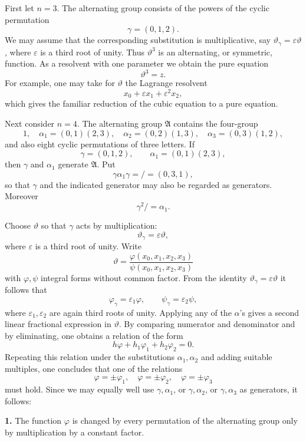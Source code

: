 \documentclass[11pt,a4paper]{book}
\newcommand{\A}{\mathfrak A}
\begin{document}
First let $n=3$.  The alternating group consists of the powers of the cyclic permutation
\[
 \gamma=(0,1,2).
\]
We may assume that the corresponding substitution is multiplicative, say $\vartheta_\gamma=\varepsilon\vartheta$, where $\varepsilon$ is a third root of unity.  Thus $\vartheta^3$ is an alternating, or symmetric, function.  As a resolvent with one parameter we obtain the pure equation
\[
 \vartheta^3=z.
\]
For example, one may take for $\vartheta$ the Lagrange resolvent
\[
 x_0+\varepsilon x_1+\varepsilon^2x_2,
\]
which gives the familiar reduction of the cubic equation to a pure equation.

Next consider $n=4$.  The alternating group $\A$ contains the four-group
\[
 1,
 \quad\alpha_1=(0,1)(2,3),
 \quad\alpha_2=(0,2)(1,3),
 \quad\alpha_3=(0,3)(1,2),
\]
and also eight cyclic permutations of three letters.  If
\[
 \gamma=(0,1,2),\qquad \alpha_1=(0,1)(2,3),
\]
then $\gamma$ and $\alpha_1$ generate $\A$.  Put
\[
 \gamma\alpha_1\gamma=/\!=(0,3,1),
\]
so that $\gamma$ and the indicated generator may also be regarded as generators.  Moreover
\begin{equation}
 \gamma^2/=\alpha_1.
\end{equation}

Choose $\vartheta$ so that $\gamma$ acts by multiplication:
\[
 \vartheta_\gamma=\varepsilon\vartheta,
\]
where $\varepsilon$ is a third root of unity.  Write
\begin{equation}
 \vartheta=\frac{\varphi(x_0,x_1,x_2,x_3)}{\psi(x_0,x_1,x_2,x_3)}
\end{equation}
with $\varphi,\psi$ integral forms without common factor.  From the identity $\vartheta_\gamma=\varepsilon\vartheta$ it follows that
\[
 \varphi_\gamma=\varepsilon_1\varphi,
 \qquad
 \psi_\gamma=\varepsilon_2\psi,
\]
where $\varepsilon_1,\varepsilon_2$ are again third roots of unity.  Applying any of the $\alpha$'s gives a second linear fractional expression in $\vartheta$.  By comparing numerator and denominator and by eliminating, one obtains a relation of the form
\[
 h\varphi+h_1\varphi_1+h_2\varphi_2=0.
\]
Repeating this relation under the substitutions $\alpha_1,
\alpha_2$ and adding suitable multiples, one concludes that one of the relations
\[
 \varphi=\pm\varphi_1,
 \quad
 \varphi=\pm\varphi_2,
 \quad
 \varphi=\pm\varphi_3
\]
must hold.  Since we may equally well use $\gamma,
\alpha_1$, or $\gamma,
\alpha_2$, or $\gamma,
\alpha_3$ as generators, it follows:

\textbf{1.} The function $\varphi$ is changed by every permutation of the alternating group only by multiplication by a constant factor.
\end{document}
